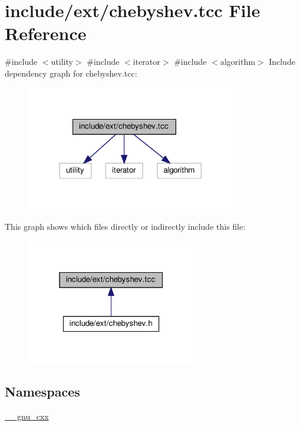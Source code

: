 \hypertarget{chebyshev_8tcc}{}\section{include/ext/chebyshev.tcc File Reference}
\label{chebyshev_8tcc}
{\ttfamily \#include $<$utility$>$}\newline
{\ttfamily \#include $<$iterator$>$}\newline
{\ttfamily \#include $<$algorithm$>$}\newline
Include dependency graph for chebyshev.\+tcc\+:
\nopagebreak
\begin{figure}[H]
\begin{center}
\leavevmode
\includegraphics[width=260pt]{chebyshev_8tcc__incl}
\end{center}
\end{figure}
This graph shows which files directly or indirectly include this file\+:
\nopagebreak
\begin{figure}[H]
\begin{center}
\leavevmode
\includegraphics[width=211pt]{chebyshev_8tcc__dep__incl}
\end{center}
\end{figure}
\subsection*{Namespaces}
\begin{DoxyCompactItemize}
\item 
 \hyperlink{namespace____gnu__cxx}{\+\_\+\+\_\+gnu\+\_\+cxx}
\end{DoxyCompactItemize}
